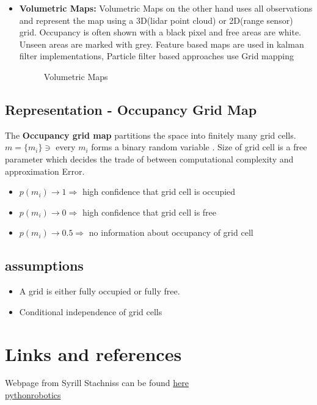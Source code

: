 \documentclass{article}
\begin{document}
\begin{itemize}
\item \textbf{Volumetric Maps:} Volumetric Maps on the other hand uses all observations and represent the map using a 3D(lidar point cloud) or 2D(range sensor) grid. Occupancy is often shown with a black pixel and free areas are white. Unseen areas are marked with grey. Feature based maps are used in kalman filter implementations, Particle filter based approaches use Grid mapping  
    \begin{figure}%
    \centering
    \qquad
    \caption{Volumetric Maps}%
    \label{fig:example}%
    \end{figure}
\end{itemize}

\subsection{Representation - Occupancy Grid Map}
 The \textbf{Occupancy grid map} partitions the space into finitely many grid cells. $m = \{m_i\} \ni $ every $m_i$ forms a binary random variable . Size of grid cell is a free parameter which decides the trade of between computational complexity and approximation Error. 
\begin{itemize}
    \item $p(m_i) \to 1 \Rightarrow $ high confidence that grid cell is occupied
    \item $p(m_i) \to 0 \Rightarrow $ high confidence that grid cell is free
    \item $p(m_i) \to 0.5 \Rightarrow $ no information about occupancy of grid cell
\end{itemize}
\subsection{assumptions}
\begin{itemize}
        \item A grid is either fully occupied or fully free.
            \item Conditional independence of grid cells
\end{itemize}

\section{Links and references}

Webpage from Syrill Stachniss can be found \href{http://ais.informatik.uni-freiburg.de/teaching/ws13/mapping/}{here}\\
\href{https://pythonrobotics.readthedocs.io}{pythonrobotics}
\end{document}
